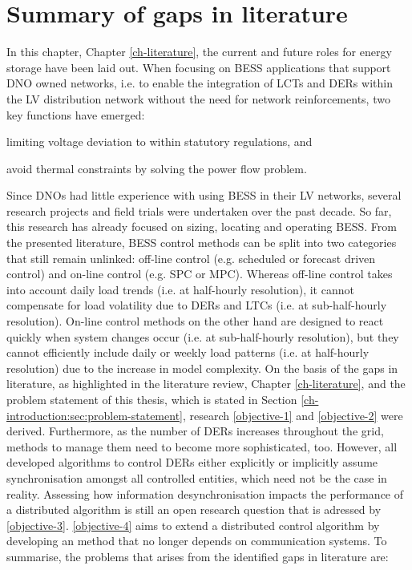 \section{Summary of gaps in literature}
\label{ch-literature:sec:literature-gaps}

In this chapter, Chapter \ref{ch-literature}, the current and future roles for energy storage have been laid out.
When focusing on BESS applications that support DNO owned networks, i.e. to enable the integration of LCTs and DERs within the LV distribution network without the need for network reinforcements, two key functions have emerged:
\begin{enumerate*}
	\item limiting voltage deviation to within statutory regulations, and
	\item avoid thermal constraints by solving the power flow problem.
\end{enumerate*}
Since DNOs had little experience with using BESS in their LV networks, several research projects and field trials were undertaken over the past decade.
So far, this research has already focused on sizing, locating and operating BESS.
From the presented literature, BESS control methods can be split into two  categories that still remain unlinked: off-line control (e.g. scheduled or forecast driven control) and on-line control (e.g. SPC or MPC).
Whereas off-line control takes into account daily load trends (i.e. at half-hourly resolution), it cannot compensate for load volatility due to DERs and LTCs (i.e. at sub-half-hourly resolution).
On-line control methods on the other hand are designed to react quickly when system changes occur (i.e. at sub-half-hourly resolution), but they cannot efficiently include daily or weekly load patterns (i.e. at half-hourly resolution) due to the increase in model complexity.
On the basis of the gaps in literature, as highlighted in the literature review, Chapter \ref{ch-literature}, and the problem statement of this thesis, which is stated in Section \ref{ch-introduction:sec:problem-statement}, research \ref{objective-1} and \ref{objective-2} were derived.
Furthermore, as the number of DERs increases throughout the grid, methods to manage them need to become more sophisticated, too.
However, all developed algorithms to control DERs either explicitly or implicitly assume synchronisation amongst all controlled entities, which need not be the case in reality.
Assessing how information desynchronisation impacts the performance of a distributed algorithm is still an open research question that is adressed by \ref{objective-3}.
\ref{objective-4} aims to extend a distributed control algorithm by developing an method that no longer depends on communication systems.
To summarise, the problems that arises from the identified gaps in literature are:

